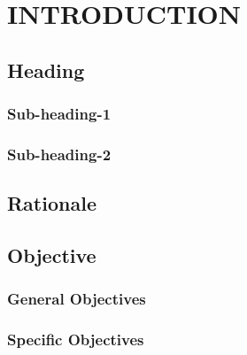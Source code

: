 
\chapter{INTRODUCTION}

\section{Heading}

\subsection{Sub-heading-1}

\subsection{Sub-heading-2}
	
\section{Rationale}

\section{Objective}

\subsection{General Objectives}

\subsection{Specific Objectives}



















